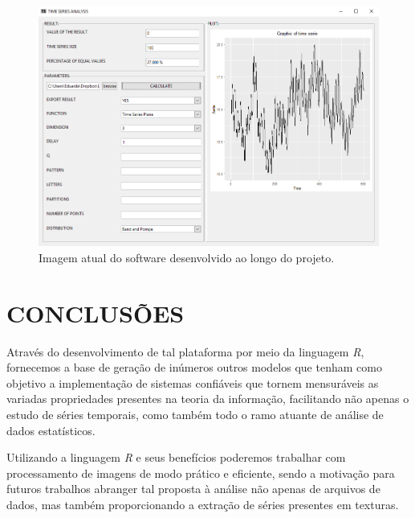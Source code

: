 \documentclass[12pt,letterpaper]{article}
\begin{document}
\begin{figure}[!ht]
	\centering
	\includegraphics[width=0.95\columnwidth]{TMS}   
    \caption{Imagem atual do software desenvolvido ao longo do projeto.}
    \vspace{6cm}
\end{figure}

\vspace*{9cm}


\section*{\centering \textbf{CONCLUSÕES}} %

 Através do desenvolvimento de tal plataforma por meio da linguagem \textit{R}, fornecemos a base de geração de inúmeros outros modelos que tenham como objetivo a implementação de sistemas confiáveis que tornem mensuráveis as variadas propriedades presentes na teoria da informação, facilitando não apenas o estudo de séries temporais, como também todo o ramo atuante de análise de dados estatísticos.

Utilizando a linguagem \textit{R} e seus benefícios poderemos trabalhar com processamento de imagens de modo prático e eficiente, sendo a motivação para futuros trabalhos abranger tal proposta à análise não apenas de arquivos de dados, mas também proporcionando a extração de séries presentes em texturas.


\newpage
\end{document}
